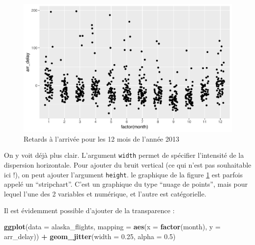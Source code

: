 \documentclass[a4paperpaper,]{article}
\newenvironment{Shaded}{\begin{snugshade}}{\end{snugshade}}
\newcommand{\KeywordTok}[1]{\textcolor[rgb]{0.13,0.29,0.53}{\textbf{#1}}}
\newcommand{\DataTypeTok}[1]{\textcolor[rgb]{0.13,0.29,0.53}{#1}}
\newcommand{\FloatTok}[1]{\textcolor[rgb]{0.00,0.00,0.81}{#1}}
\newcommand{\StringTok}[1]{\textcolor[rgb]{0.31,0.60,0.02}{#1}}
\newcommand{\OperatorTok}[1]{\textcolor[rgb]{0.81,0.36,0.00}{\textbf{#1}}}
\newcommand{\NormalTok}[1]{#1}
\theoremstyle{definition}
\theoremstyle{definition}
\theoremstyle{definition}
\theoremstyle{remark}
\begin{document}
\begin{figure}[htpb]

{\centering \includegraphics[width=0.9\linewidth]{figure/jittering-1} 

}

\caption{Retards à l'arrivée pour les 12 mois de l'année 2013}\label{fig:jittering}
\end{figure}

On y voit déjà plus clair. L'argument \texttt{width} permet de spécifier
l'intensité de la dispersion horizontale. Pour ajouter du bruit vertical
(ce qui n'est pas souhaitable ici !), on peut ajouter l'argument
\texttt{height}. le graphique de la figure \ref{fig:jittering} est
parfois appelé un ``stripchart''. C'est un graphique du type ``nuage de
points'', mais pour lequel l'une des 2 variables et numérique, et
l'autre est catégorielle.

Il est évidemment possible d'ajouter de la transparence :

\begin{Shaded}
\begin{Highlighting}[]
\KeywordTok{ggplot}\NormalTok{(}\DataTypeTok{data =}\NormalTok{ alaska_flights, }\DataTypeTok{mapping =} \KeywordTok{aes}\NormalTok{(}\DataTypeTok{x =} \KeywordTok{factor}\NormalTok{(month), }\DataTypeTok{y =}\NormalTok{ arr_delay)) }\OperatorTok{+}
\StringTok{  }\KeywordTok{geom_jitter}\NormalTok{(}\DataTypeTok{width =} \FloatTok{0.25}\NormalTok{, }\DataTypeTok{alpha =} \FloatTok{0.5}\NormalTok{)}
\end{Highlighting}
\end{Shaded}
\end{document}
